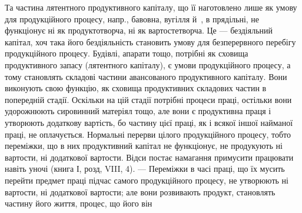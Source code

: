 Та частина лятентного продуктивного капіталу, що її наготовлено
лише як умову для продукційного процесу, напр., бавовна, вугілля й~, в прядільні, не функціонує ні як продуктотворча, ні як вартостетворча.
Це — бездіяльний капітал, хоч така його бездіяльність становить
умову для безперервного перебігу продукційного процесу. Будівлі, апарати
тощо, потрібні як сховища продуктивного запасу (лятентного капіталу),
є умови продукційного процесу, а тому становлять складові частини авансованого
продуктивного капіталу. Вони виконують свою функцію, як сховища
продуктивних складових частин в попередній стадії. Оскільки на цій стадії
потрібні процеси праці, остільки вони удорожнюють сировинний матеріял
тощо, але вони є продуктивна праця і утворюють додаткову
вартість, бо частину цієї праці, як і всякої іншої найманої праці, не
оплачується. Нормальні перерви цілого продукційного процесу, тобто
переміжки, що в них продуктивний капітал не функціонує, не продукують
ні вартости, ні додаткової вартости. Відси постає намагання примусити
працювати навіть уночі (книга І, розд, VIII, 4). — Переміжки в часі праці,
що їх мусить перейти предмет праці підчас самого продукційного процесу,
не утворюють ні вартости, ні додаткової вартости; але вони розвивають
продукт, становлять частину його життя, процес, що його він
\parbreak{}  %

